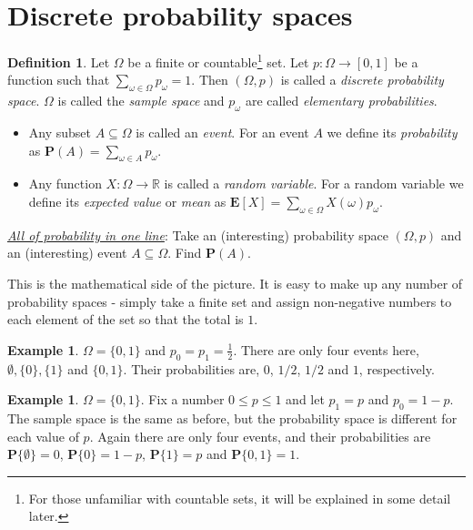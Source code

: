 \documentclass[preprint,  11pt]{amsart}
\theoremstyle{plain} %
\theoremstyle{definition} %
\newtheorem{definition}[theorem]{Definition}
\newtheorem{example}[theorem]{Example}
\begin{document}
\section{Discrete probability spaces}
\begin{definition} Let $\Omega$ be a finite or countable\footnote{For those unfamiliar with countable sets, it will be explained in some detail later.} set. Let $p:\Omega\rightarrow [0,1]$ be a function such that $\sum_{\omega\in \Omega}p_{\omega}=1$. Then $(\Omega,p)$ is called a {\em discrete probability space}. $\Omega$ is called the {\em sample space} and $p_{\omega}$ are called {\em elementary probabilities}. 
\begin{itemize}
\item Any subset $A\subseteq \Omega$ is called an {\em event}. For an event $A$ we define its {\em probability} as $\mathbf{P}(A)=\sum_{\omega\in A}p_{\omega}$.
\item Any function $X:\Omega\rightarrow \mathbb{R}$ is called a {\em random variable}.  For a random variable we define its {\em expected value} or {\em mean} as $\mathbf{E}[X]=\sum_{\omega \in \Omega}X(\omega)p_{\omega}$.
\end{itemize}
\end{definition}

{\em\underline{ All of probability in one line}}: Take an (interesting) probability space $(\Omega, p)$ and an (interesting) event $A\subseteq \Omega$. Find $\mathbf{P}(A)$. 



\vspace{2mm}
This is the mathematical side of the picture. It is easy to make up any number of probability spaces -  simply take a finite set and assign non-negative numbers to each element of the set so that the total is $1$.
\begin{example} $\Omega=\{0,1\}$ and $p_{0}=p_{1}=\frac{1}{2}$. There are only four events here, $\emptyset, \{0\}, \{1\}$ and $\{0,1\}$. Their probabilities are, $0$, $1/2$, $1/2$ and $1$, respectively.
\end{example}

\begin{example}\label{eg:onecointoss} $\Omega=\{0,1\}$. Fix a number $0\le p \le 1$ and let $p_{1}=p$ and $p_{0}=1-p$. The sample space is the same as before, but the probability space is different for each value of $p$. Again there are only four events, and their probabilities are $\mathbf{P}\{\emptyset\}=0$, $\mathbf{P}\{0\}=1-p$, $\mathbf{P}\{1\}=p$ and $\mathbf{P}\{0,1\}=1$. 
\end{example}
\end{document}
